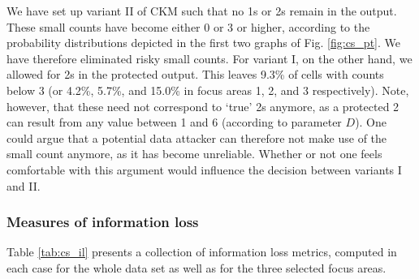 We have set up variant II of CKM such that no 1s or 2s remain in the output. 
These small counts have become either 0 or 3 or higher, according to the probability distributions depicted in the first two graphs of Fig. \ref{fig:cs_pt}. We have therefore eliminated risky small counts. For variant I, on the other hand, we allowed for 2s in the protected output.
This leaves 9.3\% of cells with counts below 3 (or 4.2\%, 5.7\%, and 15.0\% in focus areas 1, 2, and 3 respectively).
Note, however, that these need not correspond to `true' 2s anymore, as a protected 2 can result from any value between 1 and 6 (according to parameter $D$). One could argue that a potential data attacker can therefore not make use of the small count anymore, as it has become unreliable. Whether or not one feels comfortable with this argument would influence the decision between variants I and II.

\subsubsection{Measures of information loss}

Table \ref{tab:cs_il} presents a collection of information loss metrics, computed in each case for the whole data set as well as for the three selected focus areas.

